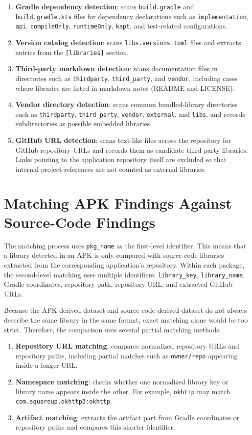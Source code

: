 \documentclass[12pt,a4paper]{report}
\begin{document}
\begin{enumerate}
\item \textbf{Gradle dependency detection}: scans \texttt{build.gradle} and \texttt{build.gradle.kts} files for dependency declarations such as \texttt{implementation}, \texttt{api}, \texttt{compileOnly}, \texttt{runtimeOnly}, \texttt{kapt}, and test-related configurations.
\item \textbf{Version catalog detection}: scans \texttt{libs.versions.toml} files and extracts entries from the \texttt{[libraries]} section.
\item \textbf{Third-party markdown detection}: scans documentation files in directories such as \texttt{thirdparty}, \texttt{third\_party}, and \texttt{vendor}, including cases where libraries are listed in markdown notes (README and LICENSE).
\item \textbf{Vendor directory detection}: scans common bundled-library directories such as \texttt{thirdparty}, \texttt{third\_party}, \texttt{vendor}, \texttt{external}, and \texttt{libs}, and records subdirectories as possible embedded libraries.
\item \textbf{GitHub URL detection}: scans text-like files across the repository for GitHub repository URLs and records them as candidate third-party libraries. Links pointing to the application repository itself are excluded so that internal project references are not counted as external libraries.
\end{enumerate}

\section{Matching APK Findings Against Source-Code Findings}
The matching process uses \texttt{pkg\_name} as the first-level identifier. This means that a library detected in an APK is only compared with source-code libraries extracted from the corresponding application's repository. Within each package, the second-level matching uses multiple identifiers: \texttt{library\_key}, \texttt{library\_name}, Gradle coordinates, repository path, repository URL, and extracted GitHub URLs.

Because the APK-derived dataset and source-code-derived dataset do not always describe the same library in the same format, exact matching alone would be too strict. Therefore, the comparison uses several partial matching methods:

\begin{enumerate}
\item \textbf{Repository URL matching}: compares normalized repository URLs and repository paths, including partial matches such as \texttt{owner/repo} appearing inside a longer URL.
\item \textbf{Namespace matching}: checks whether one normalized library key or library name appears inside the other. For example, \texttt{okhttp} may match \texttt{com.squareup.okhttp3:okhttp}.
\item \textbf{Artifact matching}: extracts the artifact part from Gradle coordinates or repository paths and compares this shorter identifier.
\end{enumerate}
\end{document}
